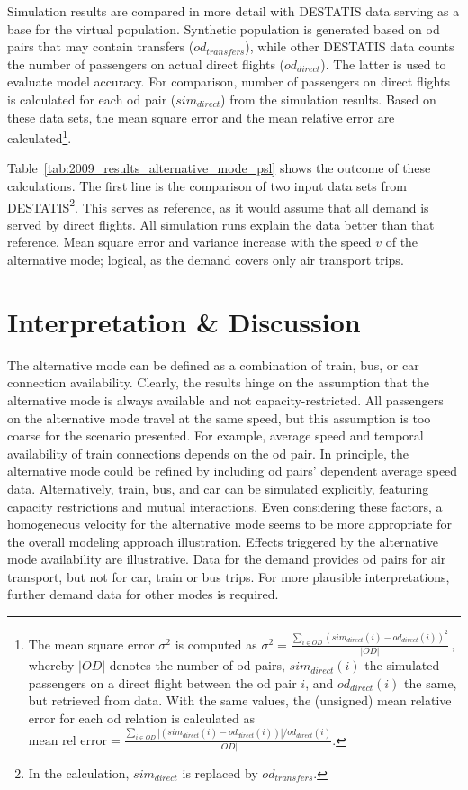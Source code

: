Simulation results are compared in more detail with DESTATIS data serving as a base for the virtual population.  
Synthetic population is generated based on \gls{od} pairs that may contain transfers ($od_{transfers}$), 
while other DESTATIS data counts the number of passengers on actual direct flights ($od_{direct}$). %
The latter is used to evaluate model accuracy.
For comparison, number of passengers on direct flights is calculated for each \gls{od} pair ($sim_{direct}$) from the simulation results.
Based on these data sets, the mean square error and the mean relative error are calculated\footnote{
The mean square error $\sigma^2$ is computed as
	$\sigma^2 = \frac{\sum_{i \in OD} (sim_{direct}(i) - od_{direct}(i))^2}{|OD|} \, , $
whereby $|OD|$ denotes the number of \gls{od} pairs, $sim_{direct}(i)$ the simulated passengers on a direct flight between the \gls{od} pair $i$, and $od_{direct}(i)$ the same, but retrieved from data.  
With the same values, the (unsigned) mean relative error for each \gls{od} relation is calculated as
$
\mbox{mean rel error} = \frac{\sum_{i \in OD} |(sim_{direct}(i) - od_{direct}(i))|/ od_{direct}(i)}{|OD|}.
$
}. 

Table~\ref{tab:2009_results_alternative_mode_psl} shows the outcome of these calculations. 
The first line is the comparison of two input data sets from DESTATIS\footnote{In the calculation, $sim_{direct}$ is replaced by $od_{transfers}$.}. 
This serves as reference, as it would assume that all demand is served by direct flights.
All simulation runs explain the data better than that reference.
Mean square error and variance increase with the speed $v$ of the alternative mode;  
logical, as the demand covers only air transport trips. 

\section{Interpretation \& Discussion}
\label{sec:air_rail_discussion}
The alternative mode can be defined as a combination of train, bus, or car connection availability. 
Clearly, the results hinge on the assumption that the alternative mode is always available and not capacity-restricted.  
All passengers on the alternative mode travel at the same speed, but 
this assumption is too coarse for the scenario presented. 
For example, average speed and temporal availability of train connections depends on the \gls{od} pair. 
In principle, the alternative mode could be refined by including \gls{od} pairs' dependent average speed data. 
Alternatively, train, bus, and car can be simulated explicitly, featuring capacity restrictions and mutual interactions. 
Even considering these factors, a homogeneous velocity for the alternative mode seems to be more appropriate for the overall modeling approach illustration. 
Effects triggered by the alternative mode availability are illustrative. 
Data for the demand provides \gls{od} pairs for air transport, but not for car, train or bus trips.  
For more plausible interpretations, further demand data for other modes is required. 

